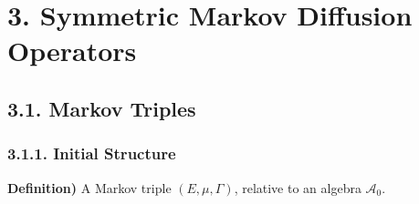 \documentclass{article}
\DeclarePairedDelimiter\bignorm{\lVert}{\rVert}
\newcommand{\doublerule}[1][.4pt]{%
  \noindent
  \makebox[0pt][l]{\rule[.7ex]{\linewidth}{#1}}%
  \rule[.3ex]{\linewidth}{#1}}
\begin{document}
\newcommand{\thm}{\textbf{Theorem) }}
\newcommand{\thmnum}[1]{\textbf{Theorem #1) }}
\newcommand{\defi}{\textbf{Definition) }}
\newcommand{\definum}[1]{\textbf{Definition #1) }}
\newcommand{\lem}{\textbf{Lemma) }}
\newcommand{\lemnum}[1]{\textbf{Lemma #1) }}
\newcommand{\prop}{\textbf{Proposition) }}
\newcommand{\propnum}[1]{\textbf{Proposition #1) }}
\newcommand{\corr}{\textbf{Corollary) }}
\newcommand{\corrnum}[1]{\textbf{Corollary #1) }}
\newcommand{\pf}{\textbf{proof) }}

\newcommand{\lap}{\triangle} %
\newcommand{\s}{\vspace{10pt}}
\newcommand{\bull}{$\bullet$}
\newcommand{\sta}{$\star$}
\newcommand{\reals}{\mathbb{R}}

\newcommand{\eop}{\hfill  \textsl{(End of proof)} $\square$} %
\newcommand{\eos}{\hfill  \textsl{(End of statement)} $\square$} %


\newcommand{\intN}{\mathbb{Z}_N}
\newcommand{\nat}{\mathbb{N}}
\newcommand{\norms}[2]{\bignorm[\big]{#1}_{#2}}
\newcommand{\abs}[1]{\big| #1 \big|}
\newcommand{\avg}{\mathbb{E}}
\newcommand{\prob}{\mathbb{P}}
\newcommand{\borel}{\mathscr{B}}
\newcommand{\EE}{\mathscr{E}}
\newcommand{\pa}{\partial}
\newcommand{\loc}{L^1_{\text{loc}}}

\renewcommand{\vec}{\underline}
\renewcommand{\bar}{\overline}

\def\doubleunderline#1{\underline{\underline{#1}}}

\newcommand{\newday}{\doublerule[0.5pt]}
\newcommand{\digression}{**********************************************************************************************}

\setlength\parindent{0pt}

\chapter*{3. Symmetric Markov Diffusion Operators}

\section*{3.1. Markov Triples}
\subsection*{3.1.1. Initial Structure}

\defi A Markov triple $(E,\mu, \Gamma)$, relative to an algebra $\mathscr{A}_0$.
\end{document}
